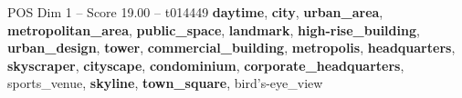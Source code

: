 \begin{textsample}{POS Dim 1 – Score 19.00 – t014449}  \label{ex:f1_pos_024}
\textbf{daytime}, \textbf{city}, \textbf{urban\_area}, \textbf{metropolitan\_area}, \textbf{public\_space}, \textbf{landmark}, \textbf{high-rise\_building}, \textbf{urban\_design}, \textbf{tower}, \textbf{commercial\_building}, \textbf{metropolis}, \textbf{headquarters}, \textbf{skyscraper}, \textbf{cityscape}, \textbf{condominium}, \textbf{corporate\_headquarters}, sports\_venue, \textbf{skyline}, \textbf{town\_square}, bird's-eye\_view

\end{textsample}
